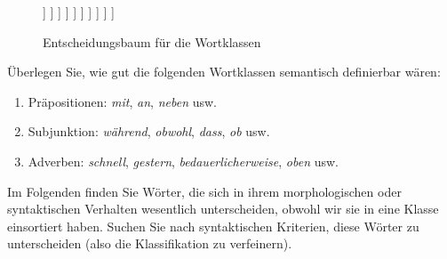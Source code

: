 \begin{figure}[!htbp]
{\begin{minipage}{\textwidth}
\begin{forest}
                    [\textit{Partikel}, intrme, no
                          [{Kann Konsti-\\tuenten verbinden?}, decide
                            [\textbf{Konjunktion}, finall, yes]
                            [\textit{Rest}, intrme, no]
                      ]
                    ]
                  ]
                ]
              ]
            ]
          ]
        ]
      ]
    ]
  \end{forest}
  \end{minipage}
  }
  \caption{Entscheidungsbaum für die Wortklassen}
  \label{fig:gesamtuebersicht053}
\end{figure}


\Uebungen

\Uebung{} \label{exc:wortklassen01} Überlegen Sie, wie gut die folgenden Wortklassen semantisch definierbar wären:

\begin{enumerate}
  \item Präpositionen: \textit{mit}, \textit{an}, \textit{neben} usw.
  \item Subjunktion: \textit{während}, \textit{obwohl}, \textit{dass}, \textit{ob} usw.
  \item Adverben: \textit{schnell}, \textit{gestern}, \textit{bedauerlicherweise}, \textit{oben} usw.
\end{enumerate}

 \label{exc:wortklassen02} Im Folgenden finden Sie Wörter, die sich in ihrem morphologischen oder syntaktischen Verhalten wesentlich unterscheiden, obwohl wir sie in eine Klasse einsortiert haben.
Suchen Sie nach syntaktischen Kriterien, diese Wörter zu unterscheiden (also die Klassifikation zu verfeinern).

